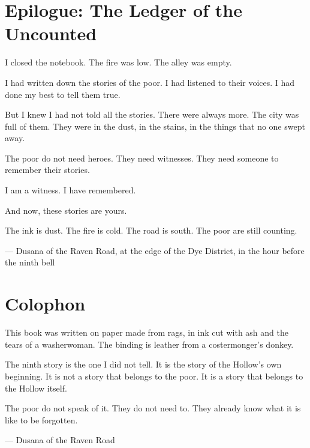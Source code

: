 \documentclass[11pt]{article}
\begin{document}
\section*{Epilogue: The Ledger of the Uncounted}
I closed the notebook. The fire was low. The alley was empty.

I had written down the stories of the poor. I had listened to their voices. I had done my best to tell them true.

But I knew I had not told all the stories. There were always more. The city was full of them. They were in the dust, in the stains, in the things that no one swept away.

The poor do not need heroes. They need witnesses. They need someone to remember their stories.

I am a witness. I have remembered.

And now, these stories are yours.

The ink is dust. The fire is cold. The road is south. The poor are still counting.

— Dusana of the Raven Road, at the edge of the Dye District, in the hour before the ninth bell

\section*{Colophon}
This book was written on paper made from rags, in ink cut with ash and the tears of a washerwoman. The binding is leather from a costermonger's donkey.

The ninth story is the one I did not tell. It is the story of the Hollow's own beginning. It is not a story that belongs to the poor. It is a story that belongs to the Hollow itself.

The poor do not speak of it. They do not need to. They already know what it is like to be forgotten.

— Dusana of the Raven Road
\end{document}
